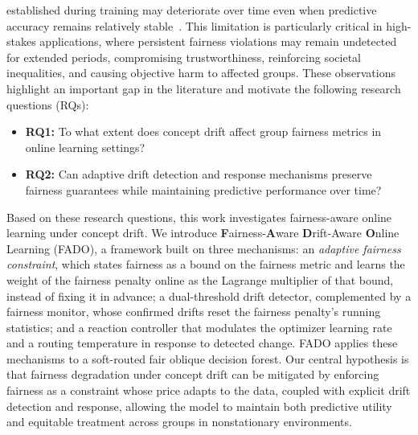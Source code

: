 \documentclass[conference]{IEEEtran}
\newcommand{\fado}{\textsc{FADO}}
\begin{document}
established during training may deteriorate over time even when predictive accuracy remains relatively stable~\cite{deho2024faircomparativeevaluationfairness}. This limitation is particularly
critical in high-stakes applications, where persistent fairness violations may remain undetected for extended periods, compromising trustworthiness, reinforcing
societal inequalities, and causing objective harm to affected groups. These observations highlight an important gap in the literature and motivate the following
research questions (RQs):
\begin{itemize}
\item \textbf{RQ1:} To what extent does concept drift affect group fairness metrics in online learning settings?
\item \textbf{RQ2:} Can adaptive drift detection and response mechanisms preserve fairness guarantees while maintaining predictive performance over time?
\end{itemize}

Based on these research questions, this work investigates fairness-aware online learning under concept drift. We introduce \textbf{F}airness-\textbf{A}ware \textbf{D}rift-Aware \textbf{O}nline
Learning (\fado{}), a framework built on three mechanisms: an \emph{adaptive fairness constraint}, which states fairness as a bound on the fairness metric and
learns the weight of the fairness penalty online as the Lagrange multiplier of that bound, instead of fixing it in advance; a dual-threshold drift detector,
complemented by a fairness monitor, whose confirmed drifts reset the fairness penalty's running statistics; and a reaction controller that modulates the optimizer
learning rate and a routing temperature in response to detected change. \fado{} applies these mechanisms to a soft-routed fair oblique decision forest. Our
central hypothesis is that fairness degradation under concept drift can be mitigated by enforcing fairness as a constraint whose price adapts to the data, coupled
with explicit drift detection and response, allowing the model to maintain both predictive utility and equitable treatment across groups in
nonstationary environments.
\end{document}
